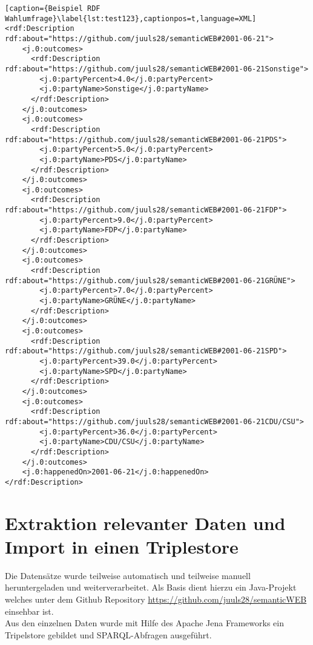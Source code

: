 \documentclass[a4paper,10pt,parskip]{article}
\begin{document}
\begin{lstlisting}[caption={Beispiel RDF Wahlumfrage}\label{lst:test123},captionpos=t,language=XML] 
<rdf:Description rdf:about="https://github.com/juuls28/semanticWEB#2001-06-21">
    <j.0:outcomes>
      <rdf:Description rdf:about="https://github.com/juuls28/semanticWEB#2001-06-21Sonstige">
        <j.0:partyPercent>4.0</j.0:partyPercent>
        <j.0:partyName>Sonstige</j.0:partyName>
      </rdf:Description>
    </j.0:outcomes>
    <j.0:outcomes>
      <rdf:Description rdf:about="https://github.com/juuls28/semanticWEB#2001-06-21PDS">
        <j.0:partyPercent>5.0</j.0:partyPercent>
        <j.0:partyName>PDS</j.0:partyName>
      </rdf:Description>
    </j.0:outcomes>
    <j.0:outcomes>
      <rdf:Description rdf:about="https://github.com/juuls28/semanticWEB#2001-06-21FDP">
        <j.0:partyPercent>9.0</j.0:partyPercent>
        <j.0:partyName>FDP</j.0:partyName>
      </rdf:Description>
    </j.0:outcomes>
    <j.0:outcomes>
      <rdf:Description rdf:about="https://github.com/juuls28/semanticWEB#2001-06-21GRÜNE">
        <j.0:partyPercent>7.0</j.0:partyPercent>
        <j.0:partyName>GRÜNE</j.0:partyName>
      </rdf:Description>
    </j.0:outcomes>
    <j.0:outcomes>
      <rdf:Description rdf:about="https://github.com/juuls28/semanticWEB#2001-06-21SPD">
        <j.0:partyPercent>39.0</j.0:partyPercent>
        <j.0:partyName>SPD</j.0:partyName>
      </rdf:Description>
    </j.0:outcomes>
    <j.0:outcomes>
      <rdf:Description rdf:about="https://github.com/juuls28/semanticWEB#2001-06-21CDU/CSU">
        <j.0:partyPercent>36.0</j.0:partyPercent>
        <j.0:partyName>CDU/CSU</j.0:partyName>
      </rdf:Description>
    </j.0:outcomes>
    <j.0:happenedOn>2001-06-21</j.0:happenedOn>
</rdf:Description>
\end{lstlisting}

\section{Extraktion relevanter Daten und Import in einen Triplestore }

Die Datensätze wurde teilweise automatisch und teilweise manuell heruntergeladen und weiterverarbeitet. Als Basis dient hierzu ein Java-Projekt welches unter dem Github Repository \url{https://github.com/juuls28/semanticWEB} einsehbar ist.\\
Aus den einzelnen Daten wurde mit Hilfe des Apache Jena Frameworks ein Tripelstore gebildet und SPARQL-Abfragen ausgeführt.
\end{document}

